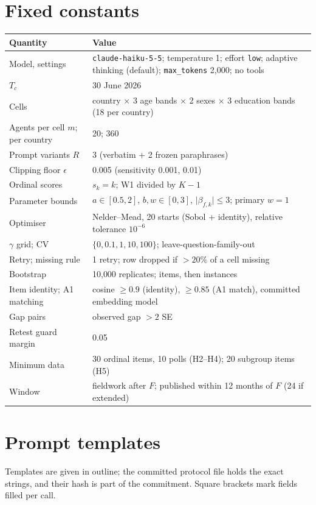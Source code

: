 \documentclass[11pt]{article}
\begin{document}
\section{Fixed constants}
\label{app:constants}
\begin{tabular}{@{}L{5.5cm}L{9.5cm}@{}}
\toprule
Quantity & Value \\
\midrule
Model, settings & \texttt{claude-haiku-5-5}; temperature 1; effort \texttt{low}; adaptive thinking (default); \texttt{max\_tokens} 2{,}000; no tools \\
$T_c$ & 30 June 2026 \\
Cells & country $\times$ 3 age bands $\times$ 2 sexes $\times$ 3 education bands (18 per country) \\
Agents per cell $m$; per country & 20; 360 \\
Prompt variants $R$ & 3 (verbatim + 2 frozen paraphrases) \\
Clipping floor $\epsilon$ & 0.005 (sensitivity 0.001, 0.01) \\
Ordinal scores & $s_k=k$; W1 divided by $K-1$ \\
Parameter bounds & $a\in[0.5,2]$, $b,w\in[0,3]$, $\lvert\beta_{f,k}\rvert\le3$; primary $w=1$ \\
Optimiser & Nelder--Mead, 20 starts (Sobol + identity), relative tolerance $10^{-6}$ \\
$\gamma$ grid; CV & $\{0,0.1,1,10,100\}$; leave-question-family-out \\
Retry; missing rule & 1 retry; row dropped if $>20\%$ of a cell missing \\
Bootstrap & 10{,}000 replicates; items, then instances \\
Item identity; A1 matching & cosine $\ge0.9$ (identity), $\ge0.85$ (A1 match), committed embedding model \\
Gap pairs & observed gap $>2$ SE \\
Retest guard margin & 0.05 \\
Minimum data & 30 ordinal items, 10 polls (H2--H4); 20 subgroup items (H5) \\
Window & fieldwork after $F$; published within 12 months of $F$ (24 if extended) \\
\bottomrule
\end{tabular}

\section{Prompt templates}
\label{app:prompts}
Templates are given in outline; the committed protocol file holds the exact strings, and their hash is part of the commitment. Square brackets mark fields filled per call.
\end{document}
